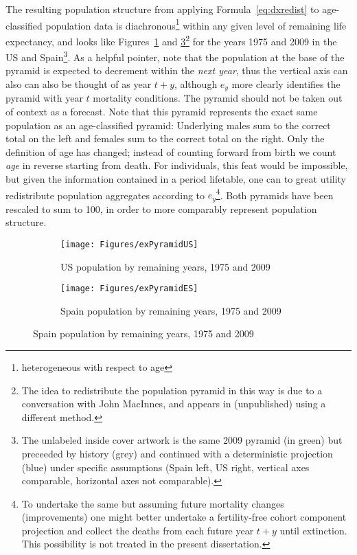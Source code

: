  \FloatBarrier

The resulting
population structure from applying Formula~\eqref{eq:dxredist} to age-classified
population data is diachronous\footnote{heterogeneous with respect to age} 
within any given level of remaining life expectancy, and 
looks like Figures~\ref{fig:exPyrUS} and \ref{fig:exPyrES}\footnote{The idea to
redistribute the population pyramid in this way is due to a conversation with 
John MacInnes, and appears in \citep{MacInnes2013pop} (unpublished) using a
different method.} for the years 1975 and 2009 in the US and
Spain\footnote{The unlabeled inside cover artwork is the same 2009 pyramid (in
green) but preceeded by history (grey) and continued with a deterministic
projection (blue) under specific assumptions (Spain left, US right, vertical
axes comparable, horizontal axes not comparable).}. As a helpful pointer, note that the
population at the base of the pyramid is expected to decrement within the \textit{next year}, thus the vertical axis can also can also be thought of as year $t+y$, although $e_y$ more clearly identifies the pyramid with year $t$ mortality conditions. The pyramid should not be taken out of context as a forecast. Note that this pyramid represents the exact same
population as an age-classified pyramid: Underlying males sum to the correct total on 
the left and females sum to the correct total on the right. Only the definition of age has
changed; instead of counting forward from birth we count \textit{age} in reverse
starting from death. For individuals, this feat would be impossible, but given
 the information contained in a period lifetable, one can to great utility 
 redistribute population aggregates according to $e_y$\footnote{To undertake
 the same but assuming future mortality changes (improvements) one might
 better undertake a fertility-free cohort component projection and collect the
 deaths from each future year $t+y$ until extinction. This possibility is not
 treated in the present dissertation.}. Both pyramids have been rescaled
 to sum to 100, in order to more comparably represent population structure.

\begin{figure}
        \centering
        \begin{subfigure}
                \centering
                \caption{US population by remaining years, 1975 and 2009}
                \texttt{[image: Figures/exPyramidUS]}
                \label{fig:exPyrUS}
        \end{subfigure}
        \begin{subfigure}
                \centering
                \caption{Spain population by remaining years, 1975 and 2009}
                \texttt{[image: Figures/exPyramidES]}
               
                \label{fig:exPyrES}
        \end{subfigure}
\end{figure}

